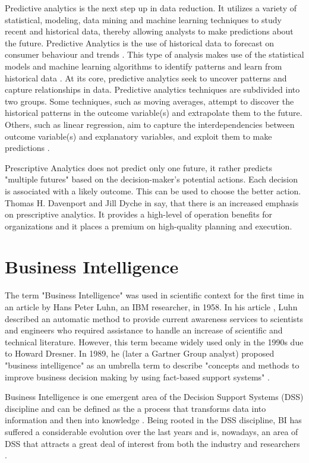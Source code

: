 \documentclass[runningheads]{llncs}
\begin{document}
Predictive analytics is the next step up in data reduction. It utilizes a variety of statistical, modeling, data mining and machine learning techniques to study recent and historical data, thereby allowing analysts to make predictions about the future\cite{CHARTER}. Predictive Analytics is the use of historical data to forecast on consumer behaviour and trends \cite{TALLIN}. This type of analysis makes use of the statistical models and machine learning algorithms to identify patterns and learn from historical data \cite{MIS}. At its core, predictive analytics seek to uncover patterns and capture relationships in data. Predictive analytics techniques are subdivided into two groups. Some techniques, such as moving averages, attempt to discover the historical patterns in the outcome variable(s) and extrapolate them to the future. Others, such as linear regression, aim to capture the interdependencies between outcome variable(s) and explanatory variables, and exploit them to make predictions \cite{ELS}.

Prescriptive Analytics does not predict only one future, it rather predicts "multiple futures" based on the decision-maker’s potential actions. Each decision is associated with a likely outcome. This can be used to choose the better action. Thomas H. Davenport and Jill Dyche in \cite{DAVENPORT} say, that there is an increased emphasis on prescriptive analytics. It provides a high-level of operation benefits for organizations and it places a premium on high-quality planning and execution. 

\section{Business Intelligence}

The term "Business Intelligence" was used in scientific context for the first time in an article by Hans Peter Luhn, an IBM researcher, in 1958. In his article \cite{LUHN}, Luhn described an automatic method to provide current awareness services to scientists and engineers who required assistance to handle an increase of scientific and technical literature. However, this term became widely used only in the 1990s due to Howard Dresner. In 1989, he (later a Gartner Group analyst) proposed "business intelligence" as an umbrella term to describe "concepts and methods to improve business decision making by using fact-based support systems" \cite{POWER}. 

Business Intelligence is one emergent area of the Decision Support Systems (DSS) discipline and can be defined as the a process that transforms data into information and then into knowledge \cite{GOLFARELLI}. Being rooted in the DSS discipline, BI has suffered a considerable evolution over the last years and is, nowadays, an area of DSS that attracts a great deal of interest from both the industry and researchers \cite{SHOLLO}.
\end{document}
